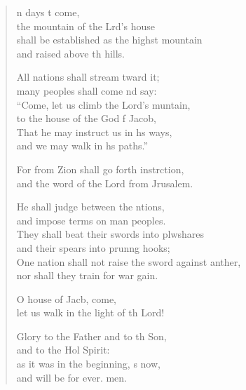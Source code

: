 \settowidth{\versewidth}{One nation shall not raise the sword against another, *}
\begin{verse}%
  \begin{patverse}
n days t come,\Med\\
the mountain of the Lrd’s house\\
shall be established as the highst mountain\Med\\
and raised above th hills.

All nations shall stream tward it;\Med\\
many peoples shall come nd say:\\
“Come, let us climb the Lord’s muntain,\Med\\
to the house of the God f Jacob,\\
That he may instruct us in h\pointup{\i}s ways, \Med\\
and we may walk in h\pointup{\i}s paths.”

For from Zion shall go forth instrction,\Med\\
and the word of the Lord from Jrusalem.

He shall judge between the ntions,\Med\\
and impose terms on man peoples.\\
They shall beat their swords into plwshares\Med\\
and their spears into prun\pointup{\i}ng hooks;\\
One nation shall not raise the sword against anther,\Med\\
nor shall they train for war gain.

O house of Jacb, come,\Med\\
let us walk in the light of th Lord!

Glory to the Father and to th Son,\Med\\
    and to the Hol Spirit:\\
as it was in the beginning, \pointup{\i}s now,\Med\\
    and will be for ever. men.
  \end{patverse}
\end{verse}
